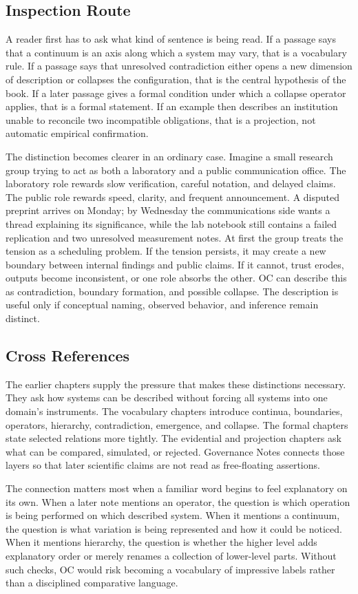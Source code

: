 \documentclass[11pt,a4paper,openany]{book}
\begin{document}
\subsection{Inspection Route}
A reader first has to ask what kind of sentence is being read. If a passage says that a continuum is an axis along which a system may vary, that is a vocabulary rule. If a passage says that unresolved contradiction either opens a new dimension of description or collapses the configuration, that is the central hypothesis of the book. If a later passage gives a formal condition under which a collapse operator applies, that is a formal statement. If an example then describes an institution unable to reconcile two incompatible obligations, that is a projection, not automatic empirical confirmation. \cite{nicolis_prigogine_selforg,kauffman_autocatalytic}\par
The distinction becomes clearer in an ordinary case. Imagine a small research group trying to act as both a laboratory and a public communication office. The laboratory role rewards slow verification, careful notation, and delayed claims. The public role rewards speed, clarity, and frequent announcement. A disputed preprint arrives on Monday; by Wednesday the communications side wants a thread explaining its significance, while the lab notebook still contains a failed replication and two unresolved measurement notes. At first the group treats the tension as a scheduling problem. If the tension persists, it may create a new boundary between internal findings and public claims. If it cannot, trust erodes, outputs become inconsistent, or one role absorbs the other. OC can describe this as contradiction, boundary formation, and possible collapse. The description is useful only if conceptual naming, observed behavior, and inference remain distinct.\par
\subsection{Cross References}
The earlier chapters supply the pressure that makes these distinctions necessary. They ask how systems can be described without forcing all systems into one domain's instruments. The vocabulary chapters introduce continua, boundaries, operators, hierarchy, contradiction, emergence, and collapse. The formal chapters state selected relations more tightly. The evidential and projection chapters ask what can be compared, simulated, or rejected. Governance Notes connects those layers so that later scientific claims are not read as free-floating assertions. \cite{nicolis_prigogine_selforg,kauffman_autocatalytic}\par
The connection matters most when a familiar word begins to feel explanatory on its own. When a later note mentions an operator, the question is which operation is being performed on which described system. When it mentions a continuum, the question is what variation is being represented and how it could be noticed. When it mentions hierarchy, the question is whether the higher level adds explanatory order or merely renames a collection of lower-level parts. Without such checks, OC would risk becoming a vocabulary of impressive labels rather than a disciplined comparative language.\par
\end{document}
